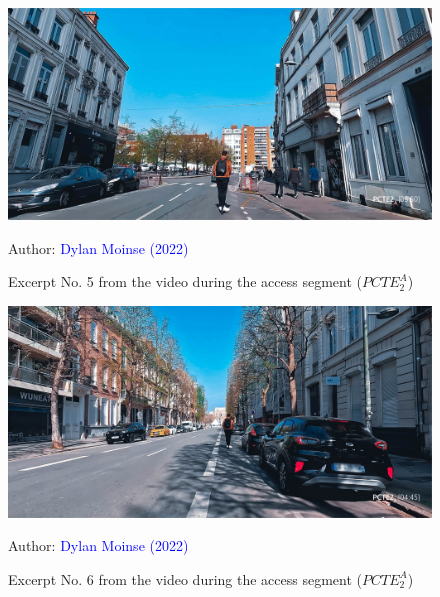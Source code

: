     \begin{figure}[h!]\vspace*{4pt}
        \caption*{Excerpt No. 5 from the video during the access segment (\(PCTE^{A}_{2}\))}
        \centerline{\includegraphics[width=0.75\columnwidth]{src/Figures/Annexes/Extrait_Video_PCTE2_Access_5.jpg}}
        \vspace{5pt}
        \begin{flushright}\scriptsize{
        Author: \textcolor{blue}{Dylan Moinse (2022)}
        }\end{flushright}
    \end{figure}

    \begin{figure}[h!]\vspace*{4pt}
        \caption*{Excerpt No. 6 from the video during the access segment (\(PCTE^{A}_{2}\))}
        \centerline{\includegraphics[width=0.75\columnwidth]{src/Figures/Annexes/Extrait_Video_PCTE2_Access_6.jpg}}
        \vspace{5pt}
        \begin{flushright}\scriptsize{
        Author: \textcolor{blue}{Dylan Moinse (2022)}
        }\end{flushright}
    \end{figure}


